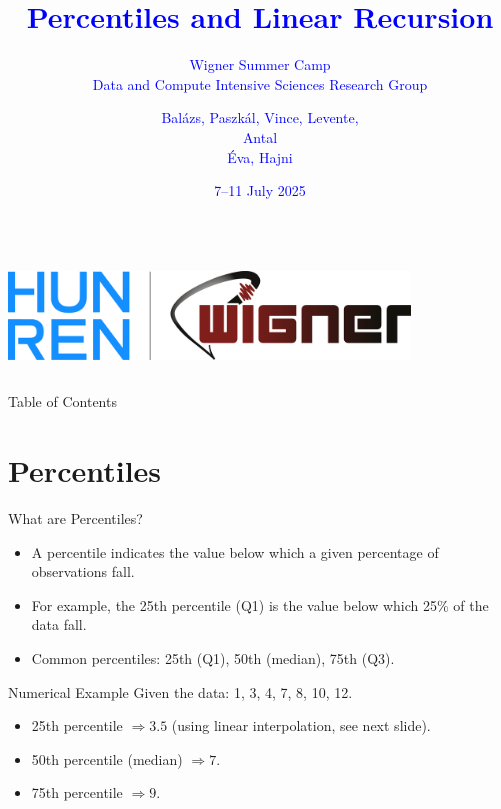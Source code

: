 \documentclass{beamer}
\title{\textcolor{blue}{Percentiles and Linear Recursion}}
\subtitle{\textcolor{blue}{Wigner Summer Camp \\ Data and Compute Intensive Sciences Research Group}}
\author{\textcolor{blue}{Bal\'azs, Paszk\'al, Vince, Levente, \\ Antal \\ \'Eva, Hajni}}
\date{\textcolor{blue}{7--11 July 2025}}
\begin{document}
\begin{frame}
  \titlepage

  \begin{columns}
    \centering
    \includegraphics[width=0.8\textwidth]{../img/logo.png}
  \end{columns}
\end{frame}

\begin{frame}{Table of Contents}
  \tableofcontents
\end{frame}

\section{Percentiles}
\begin{frame}{What are Percentiles?}
\begin{itemize}
  \item A percentile indicates the value below which a given percentage of observations fall.
  \item For example, the 25th percentile (Q1) is the value below which 25\% of the data fall.
  \item Common percentiles: 25th (Q1), 50th (median), 75th (Q3).
\end{itemize}
\end{frame}

\begin{frame}{Numerical Example}
Given the data: 1, 3, 4, 7, 8, 10, 12.
\begin{itemize}
  \item 25th percentile \( \Rightarrow 3.5 \) (using linear interpolation, see next slide).
  \item 50th percentile (median) \( \Rightarrow 7 \).
  \item 75th percentile \( \Rightarrow 9 \).
\end{itemize}
\end{frame}
\end{document}
